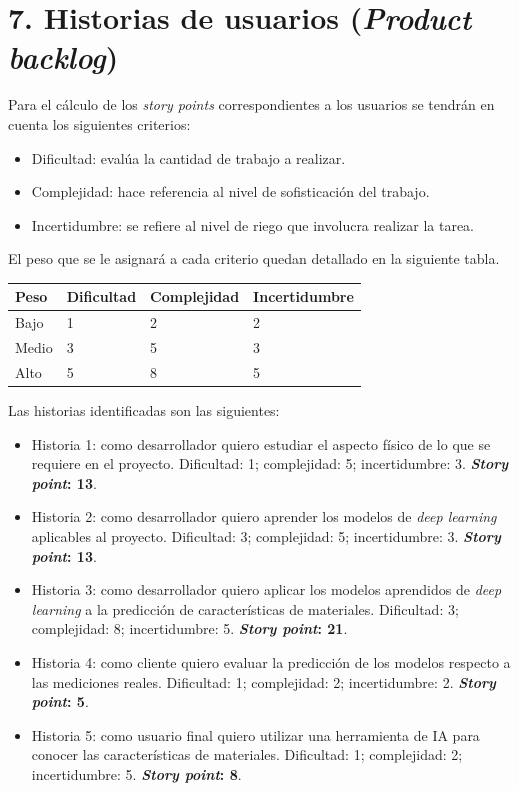 \documentclass[
11pt, %
codirector, %
]{charter}
\begin{document}
\section{7. Historias de usuarios (\textit{Product backlog})}
\label{sec:backlog}




Para el cálculo de los \textit{story points} correspondientes a los
usuarios se tendrán en cuenta los siguientes criterios:

\begin{itemize}
	\item Dificultad: evalúa la cantidad de trabajo a realizar.
	\item Complejidad: hace referencia al nivel de sofisticación del trabajo.
	\item Incertidumbre: se refiere al nivel de riego que involucra realizar
	la tarea. 
\end{itemize}

El peso que se le asignará a cada criterio quedan detallado en la 
siguiente tabla.


\begin{table}[H]
	\begin{tabularx}{\linewidth}{@{}|l|X|X|l|@{}}
	\hline
	\rowcolor[HTML]{C0C0C0} 
	Peso   & Dificultad & Complejidad 	& Incertidumbre 	\\ \hline
	Bajo   & 1      & 2	&  2   	\\ \hline
	Medio  & 3      & 5 &  3	\\ \hline
	Alto   & 5      & 8 &  5  	\\ \hline
	\end{tabularx}
\end{table}


Las historias identificadas son las siguientes:

\begin{itemize}
	\item Historia 1: como desarrollador quiero estudiar el aspecto físico
	de lo que se requiere en el proyecto. Dificultad: 1; complejidad: 5; incertidumbre: 3.  \textbf{\textit{Story point}: 13}.
	\item Historia 2: como desarrollador quiero aprender los modelos de \textit{deep learning} 
	aplicables al proyecto. Dificultad: 3; complejidad: 5; incertidumbre: 3.  \textbf{\textit{Story point}: 13}.
	\item Historia 3: como desarrollador quiero aplicar los modelos aprendidos de \textit{deep learning} 
	a la predicción de características de materiales.
	Dificultad: 3; complejidad: 8; incertidumbre: 5. \textbf{\textit{Story point}: 21}.
	\item Historia 4: como cliente quiero evaluar la predicción de los modelos respecto
	a las mediciones reales. 
	Dificultad: 1; complejidad: 2; incertidumbre: 2. \textbf{\textit{Story point}: 5}.
	\item Historia 5: como usuario final quiero utilizar una herramienta de IA para
	conocer las características de materiales. 
	Dificultad: 1; complejidad: 2; incertidumbre: 5. \textbf{\textit{Story point}: 8}.
\end{itemize}
\end{document}
